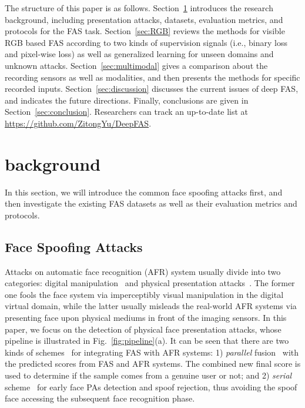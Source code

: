 \documentclass[10pt,journal,compsoc]{IEEEtran}
\begin{document}
The structure of this paper is as follows. Section~\ref{sec:background} introduces the research background, including presentation attacks, datasets, evaluation metrics, and protocols for the FAS task. Section~\ref{sec:RGB} reviews the methods for visible RGB based FAS according to two kinds of supervision signals (i.e., binary loss and pixel-wise loss) as well as generalized learning for unseen domains and unknown attacks. Section~\ref{sec:multimodal} gives a comparison about the recording sensors as well as modalities, and then presents the methods for specific recorded inputs. Section~\ref{sec:discussion} discusses the current issues of deep FAS, and indicates the future directions. Finally, conclusions are given in Section~\ref{sec:conclusion}. Researchers can track an up-to-date list at \href{https://github.com/ZitongYu/DeepFAS}{https://github.com/ZitongYu/DeepFAS}.


\vspace{-1.0em}
\section{background} \label{sec:background}

In this section, we will introduce the common face spoofing attacks first, and then investigate the existing FAS datasets as well as their evaluation metrics and protocols.  


\vspace{-1.0em}
\subsection{Face Spoofing Attacks}
Attacks on automatic face recognition (AFR) system usually divide into two categories: digital manipulation~\cite{tolosana2020deepfakes,goswami2019detecting} and physical presentation attacks~\cite{liu2021cross}. The former one fools the face system via imperceptibly visual manipulation in the digital virtual domain, while the latter usually misleads the real-world AFR systems via presenting face upon physical mediums in front of the imaging sensors. In this paper, we focus on the detection of physical face presentation attacks, whose pipeline is illustrated in Fig.~\ref{fig:pipeline}(a). It can be seen that there are two kinds of schemes~\cite{hernandez2019introduction} for integrating FAS with AFR systems: 1) \textit{parallel} fusion~\cite{de2013can} with the predicted scores from FAS and AFR systems. The combined new final score is used to determine if the sample comes from a genuine user or not; and 2) \textit{serial} scheme~\cite{li2018face} for early face PAs detection and spoof rejection, thus avoiding the spoof face accessing the subsequent face recognition phase. 
\end{document}
